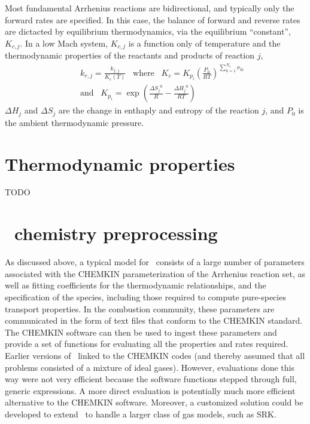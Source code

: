 Most fundamental Arrhenius reactions are bidirectional, and typically only the forward rates are specified. In this case, the balance of forward and reverse rates are dictacted by equilibrium thermodynamics, via the equilibrium ``constant'', $K_{c,j}$.  In a low Mach system, $K_{c,j}$ is a function only of temperature and the thermodynamic properties of the reactants and products of reaction $j$,
\begin{eqnarray*}
&&k_{r,j} = \frac{k_{f,j}}{K_{c}(T)} \;\;\; \mbox{where} \;\;\; K_c=K_{p_i} \left( \frac{P_{0}}{RT} \right)^{\sum_{k=1}^{N_s} \nu_{ki}}
\\
&&\mbox{and} \;\;\; K_{p_i}=\exp \left( \frac{\Delta {S_j}^{0}}{R} - \frac{\Delta {H_j}^{0}}{RT} \right)
\end{eqnarray*}
$\Delta H_j$ and $\Delta S_j$ are the change in enthaply and entropy of the reaction $j$, and $P_0$ is the ambient thermodynamic pressure.

\section{Thermodynamic properties}
\label{ThermoProp}
TODO

\section{\fuego\ chemistry preprocessing}
\label{ThermoProp}

As discussed above, a typical model for \pelelm\ consists of a large number of parameters associated with the CHEMKIN parameterization of the Arrhenius reaction set, as well as fitting coefficients for the thermodynamic relationships, and the specification of the species, including those required to compute pure-species transport properties.  In the combustion community, these parameters are communicated in the form of text files that conform to the CHEMKIN standard.  The CHEMKIN software can then be used to ingest these parameters and provide a set of functions for evaluating all the properties and rates required.  Earlier versions of \pelelm\ linked to the CHEMKIN codes (and thereby assumed that all problems consisted of a mixture of ideal gases).  However, evaluations done this way were not very efficient because the software functions stepped through full, generic expressions.  A more direct evaluation is potentially much more efficient alternative to the CHEMKIN software.  Moreover, a customized solution could be developed to extend \pelelm\ to handle a larger class of gas models, such as SRK.

